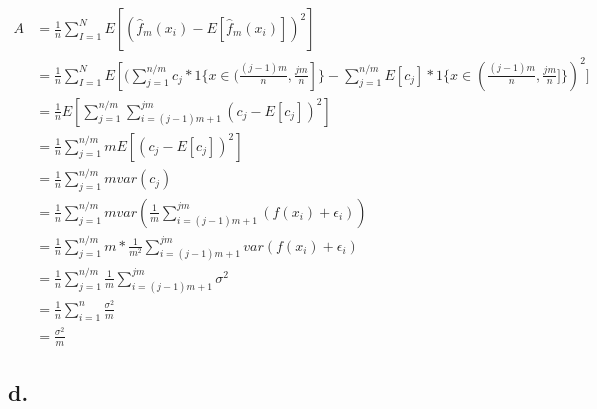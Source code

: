 \documentclass{article}
\begin{document}
\begin{subequations}
\begin{align*}
A & = \frac{1}{n} \sum_{I=1}^{N} E[ (\hat{f}_m(x_i) - E[\hat{f}_m(x_i)])^2] \\
& = \frac{1}{n} \sum_{I=1}^{N} E[(\sum_{j=1}^{n/m}  c_j*1\{x \in (\frac{(j-1)m}{n},\frac{jm}{n}]\} - \sum_{j=1}^{n/m} E[c_j] *1\{x \in (\frac{(j-1)m}{n},\frac{jm}{n}]\})^2] \\
& = \frac{1}{n} E[\sum_{j=1}^{n/m} \sum_{i=(j-1)m+1}^{jm} (c_j - E[c_j])^2  ] \\
& = \frac{1}{n} \sum_{j=1}^{n/m} m E[(c_j - E[c_j])^2] \\ 
& = \frac{1}{n} \sum_{j=1}^{n/m} m  var(c_j) \\
& = \frac{1}{n} \sum_{j=1}^{n/m} m  var(\frac{1}{m} \sum_{i=(j-1)m+1}^{jm}(f(x_i) + \epsilon_i)) \\
& =  \frac{1}{n} \sum_{j=1}^{n/m} m * \frac{1}{m^2} \sum_{i=(j-1)m+1}^{jm}var(f(x_i) + \epsilon_i) \\
& = \frac{1}{n} \sum_{j=1}^{n/m} \frac{1}{m} \sum_{i=(j-1)m+1}^{jm} \sigma^2 \\
& =  \frac{1}{n} \sum_{i=1}^{n} \frac{\sigma^2}{m} \\
& = \frac{\sigma^2}{m}
\end{align*}
\end{subequations}



\subsection*{d.}
\end{document}
